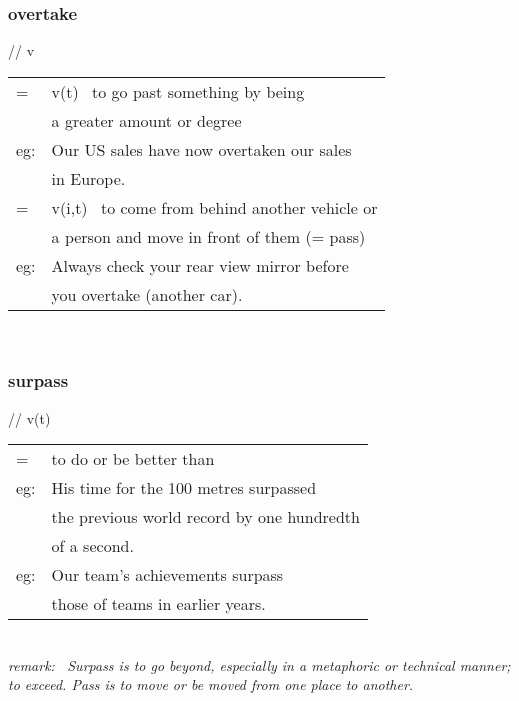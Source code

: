 \documentclass[14pt, t]{beamer}
\begin{document}
\begin{frame}
\frametitle{overtake}
// \quad v \\[2pt]
\begin{tabular}{ll}
= & v(t) \, to go past something by being \\
& a greater amount or degree \\[2pt]
eg: & Our US sales have now overtaken our sales\\
&  in Europe.\\[4pt]
= & v(i,t) \, to come from behind another vehicle or \\
& a person and move in front of them (= pass) \\[2pt]
eg: & Always check your rear view mirror before \\
& you overtake (another car). \\
\end{tabular}\\
\end{frame}
\begin{frame}[allowframebreaks]
\frametitle{surpass}
// \quad v(t) \\[2pt]
\begin{tabular}{ll}
= & to do or be better than \\[2pt]
eg: & His time for the 100 metres surpassed\\
& the previous world record by one hundredth\\
& of a second. \\[2pt]
eg: & Our team's achievements surpass \\
& those of teams in earlier years. \\ 
\end{tabular} \\
\framebreak
{\it remark: \, Surpass is to go beyond, especially in a metaphoric or technical manner; to exceed. Pass is to move or be moved from one place to another. }
\end{frame}
\end{document}
